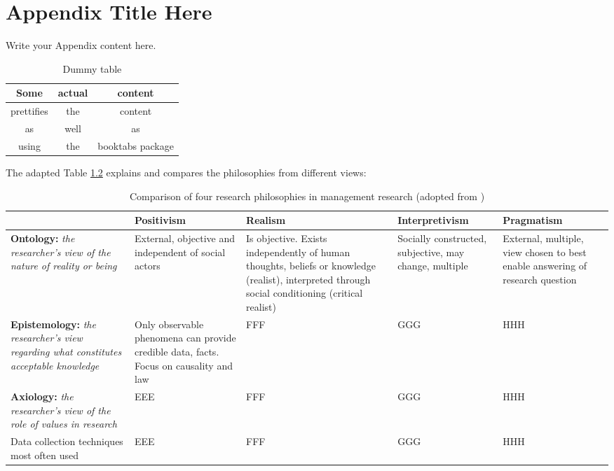 
\chapter{Appendix Title Here} %

\label{AppendixB} %




Write your Appendix content here.

\begin{table}[h!]
	\begin{center}
		\caption{Dummy table}
		\label{tbl:table2}
		\begin{tabular}{ccc}
			\toprule
			Some & actual & content\\
			\midrule
			prettifies & the & content\\
			\hline
			as & well & as\\
			\hline
			using & the & booktabs package\\
			\bottomrule
		\end{tabular}
	\end{center}
\end{table}



The adapted Table \ref{tbl:saunders} explains and compares the philosophies from different views:
\begin{table}[h!]
	\begin{center}
		\begin{tabular}{ | p{2.8cm} | p{2.5cm} | p{2.3cm} | p{2.7cm} | p{2.5cm} |} 
			\hline
			& \textbf{Positivism} & \textbf{Realism} & \textbf{Interpretivism} & \textbf{Pragmatism} \\ \hline
			\textbf{Ontology:} \textit{the researcher's view of the nature of reality or being} & External, objective and independent of social actors & Is objective. Exists independently of human thoughts, beliefs or knowledge (realist),  interpreted through social conditioning (critical realist) & Socially constructed, subjective, may change, multiple & External, multiple, view chosen to best enable answering of research question  \\ \hline
			\textbf{Epistemology:} \textit{the researcher's view regarding what constitutes acceptable knowledge} & Only observable phenomena can provide credible data, facts. Focus on causality and law & FFF & GGG & HHH \\
			\hline
			\textbf{Axiology:} \textit{the researcher's view of the role of values in research} & EEE & FFF & GGG & HHH \\ 
			\hline
			Data collection techniques most often used & EEE & FFF & GGG & HHH \\ 
			\hline
		\end{tabular}
		\caption{Comparison of four research philosophies in management research (adopted from \cite{Saunders2009})}
		\label{tbl:saunders}
	\end{center}
\end{table}